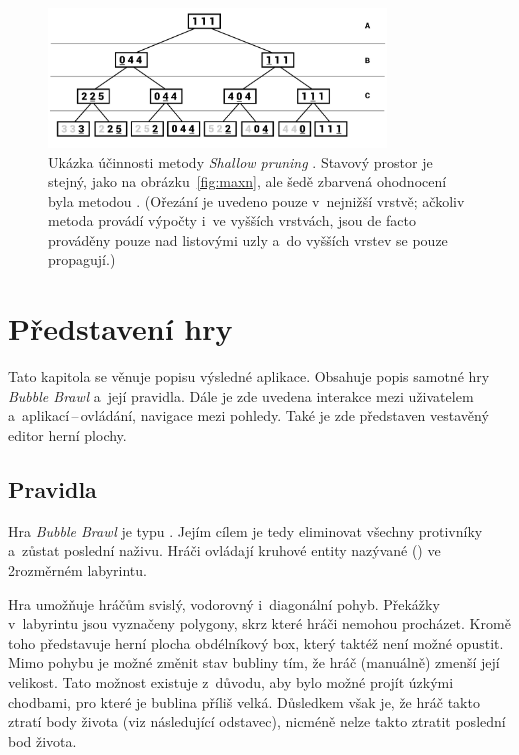 \begin{figure}[ht]
    \centering
    \includegraphics[width=0.8\textwidth]{obrazky-figures/maxn-shallow-pruning.pdf}
    \caption{Ukázka účinnosti metody \emph{Shallow pruning} \cite{Maxn}. Stavový prostor je stejný, jako na obrázku~\ref{fig:maxn}, ale šedě zbarvená ohodnocení byla metodou . (Ořezání je uvedeno pouze v~nejnižší vrstvě; ačkoliv metoda provádí výpočty i~ve vyšších vrstvách, jsou de facto prováděny pouze nad listovými uzly a~do vyšších vrstev se pouze propagují.)}
    \label{fig:maxn-shallow-pruning}
\end{figure}


\chapter{Představení hry}
\label{ch:predstaveni-hry}

Tato kapitola se věnuje popisu výsledné aplikace. Obsahuje popis samotné hry \emph{Bubble Brawl} a~její pravidla. Dále je zde uvedena interakce mezi uživatelem a~aplikací\,--\,ovládání, navigace mezi pohledy. Také je zde představen vestavěný editor herní plochy.

\section{Pravidla}

Hra \emph{Bubble Brawl} je typu . Jejím cílem je tedy eliminovat všechny protivníky a~zůstat poslední naživu. Hráči ovládají kruhové entity nazývané  () ve 2rozměrném labyrintu. 

Hra umožňuje hráčům svislý, vodorovný i~diagonální pohyb. Překážky v~labyrintu jsou vyznačeny polygony, skrz které hráči nemohou procházet. Kromě toho představuje herní plocha obdélníkový box, který taktéž není možné opustit. Mimo pohybu je možné změnit stav bubliny tím, že hráč (manuálně) zmenší její velikost. Tato možnost existuje z~důvodu, aby bylo možné projít úzkými chodbami, pro které je bublina příliš velká. Důsledkem však je, že hráč takto ztratí body života (viz následující odstavec), nicméně nelze takto ztratit poslední bod života.


